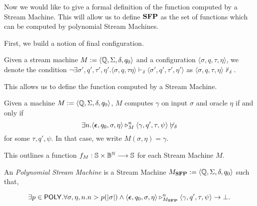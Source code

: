   \begin{conditional}{\notappendix}

    Now we would like to give a formal definition of the function computed
    by a Stream Machine. This will allow us to define $\mathbf{SFP}$ as the set of
    functions which can be
    computed by polynomial Stream Machines.

    First, we build a notion of final configuration.

    \begin{notation}
    Given a stream machine $M:=\langle\mathbb{Q},\Sigma,
    \delta, q_0\rangle$
    and a configuration
    $\langle \sigma, q,\tau,\eta\rangle$,
    we denote the condition
    $\neg\exists\sigma',
    q',\tau',\eta'.\langle \sigma,q,\tau\eta\rangle
    \vdash_{\delta}\langle
    \sigma',q',\tau',\eta'\rangle$
    as $\langle\sigma,q,\tau,\eta\rangle
    \not\vdash_{\delta}$.
    \end{notation}

    This allows us to define the function computed by a Stream Machine.

    \begin{defn}
    Given a machine
    $M:=\langle \mathbb{Q},\Sigma,\delta,q_0\rangle$,
    $M$ computes $\gamma$ on input $\sigma$
    and oracle $\eta$ if and only if
    $$
    \exists n.\langle \bm{\epsilon}, q_0,\sigma, \eta\rangle
    \triangleright^{n}_{M}
    \langle \gamma, q', \tau, \psi\rangle \not\vdash_{\delta}
    $$
    for some $\tau,q',\psi$.
    In that case, we write $M(\sigma,\eta)=\gamma$.
    \end{defn}

    This outlines a function $f_M: \mathbb{S} \times \mathbb{B}^{\mathbb{N}} \longrightarrow \mathbb{S}$
    for each Stream Machine $M$.

    \begin{defn}
    An \emph{Polynomial Stream Machine}
    is a Stream Machine $M_{\mathbf{SFP}} :=
    \langle \mathbb{Q},\Sigma,\delta,q_0\rangle$
    such that,

    $$
    \exists p \in \mathsf{POLY}.\forall \sigma, \eta,
    n. n > p(|\sigma|) \land \langle \bm{\epsilon}, q_0,\sigma, \eta\rangle
    \triangleright^{n}_{M_{\mathbf{SFP}}} \langle \gamma,
    q', \tau, \psi\rangle \to \bot.
    $$
    \end{defn}


\end{conditional}
